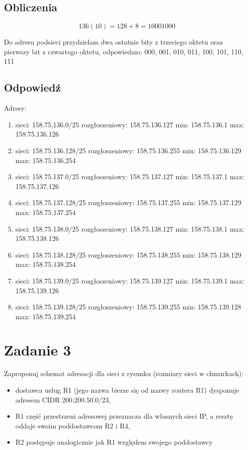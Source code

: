 \documentclass[polish, a4paper]{article}
\begin{document}
\subsection{Obliczenia}

$$136 (10) = 128+8 = 10001000$$

Do adresu podsieci przydzielam dwa ostatnie bity z trzeciego oktetu oraz pierwszy bit z czwartego oktetu, odpowiednio: 000, 001, 010, 011, 100, 101, 110, 111

\subsection{Odpowiedź}

Adresy:

\begin{enumerate}
\item{sieci: 158.75.136.0/25 rozgłoszeniowy: 158.75.136.127
min: 158.75.136.1 max: 158.75.136.126}

\item{sieci: 158.75.136.128/25 rozgłoszeniowy: 158.75.136.255
min: 158.75.136.129 max: 158.75.136.254}

\item{sieci: 158.75.137.0/25 rozgłoszeniowy: 158.75.137.127
min: 158.75.137.1 max: 158.75.137.126}

\item{sieci: 158.75.137.128/25 rozgłoszeniowy: 158.75.137.255
min: 158.75.137.129 max: 158.75.137.254}

\item{sieci: 158.75.138.0/25 rozgłoszeniowy: 158.75.138.127
min: 158.75.138.1 max: 158.75.138.126}

\item{sieci: 158.75.138.128/25 rozgłoszeniowy: 158.75.138.255
min: 158.75.138.129 max: 158.75.138.254}

\item{sieci: 158.75.139.0/25 rozgłoszeniowy: 158.75.139.127
min: 158.75.139.1 max: 158.75.139.126}

\item{sieci: 158.75.139.128/25 rozgłoszeniowy: 158.75.139.255
min: 158.75.139.128 max: 158.75.139.254}
\end{enumerate}


\section{Zadanie 3}

Zaproponuj schemat adresacji dla sieci z rysunku (rozmiary sieci w chmurkach):
\begin{itemize}
\item{dostawca usług R1 (jego nazwa bierze się od nazwy routera R1) dysponuje adresem CIDR 200.200.50.0/23,}
\item{R1 część przestrzeni adresowej przeznacza dla własnych sieci IP, a resztę oddaje swoim poddostawcom R2 i R4,}
\item{R2 postępuje analogicznie jak R1 względem swojego poddostawcy}
\end{itemize}
\end{document}
